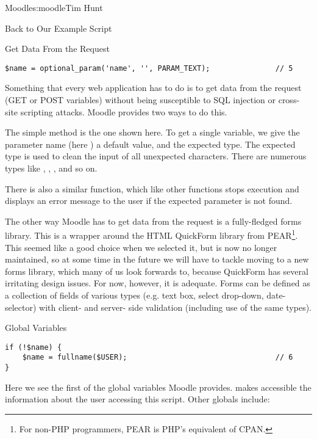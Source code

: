 \begin{aosachapter}{Moodle}{s:moodle}{Tim Hunt}
\begin{aosasect1}{Back to Our Example Script}
\begin{aosasect2}{Get Data From the Request}
\begin{verbatim}
$name = optional_param('name', '', PARAM_TEXT);               // 5
\end{verbatim}

Something that every web application has to do is to get data from the
request (GET or POST variables) without being susceptible to SQL
injection or cross-site scripting attacks. Moodle provides two ways to
do this.

The simple method is the one shown here. To get a single variable, we
give the parameter name (here ) a default value, and the
expected type. The expected type is used to clean the input of all
unexpected characters. There are numerous types like
, , , and so
on.

There is also a similar  function, which like
other  functions stops execution and displays
an error message to the user if the expected parameter is not found.

The other way Moodle has to get data from the request is a
fully-fledged forms library. This is a wrapper around the HTML
QuickForm library from PEAR\footnote{For non-PHP programmers, PEAR is
  PHP's equivalent of CPAN.}. This seemed like a good choice when we
selected it, but is now no longer maintained, so at some time in the
future we will have to tackle moving to a new forms library, which
many of us look forwards to, because QuickForm has several irritating
design issues. For now, however, it is adequate. Forms can be defined
as a collection of fields of various types (e.g. text box, select
drop-down, date-selector) with client- and server- side validation
(including use of the same  types).

\end{aosasect2}

\begin{aosasect2}{Global Variables}

\begin{verbatim}
if (!$name) {
    $name = fullname($USER);                                  // 6
}
\end{verbatim}

Here we see the first of the global variables Moodle
provides.  makes accessible the information about the
user accessing this script. Other globals include:

\begin{aosaitemize}


\end{aosaitemize}
\end{aosasect2}
\end{aosasect1}
\end{aosachapter}
